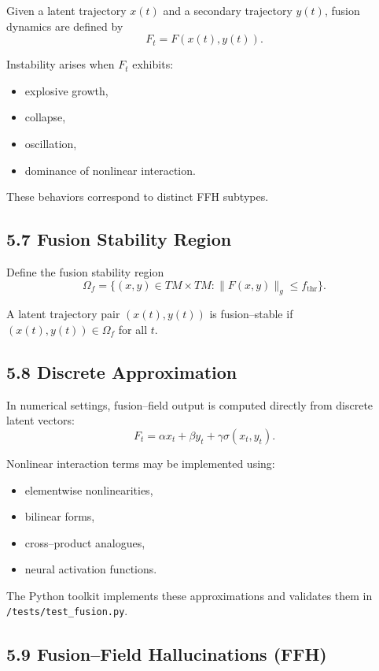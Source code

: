 Given a latent trajectory $x(t)$ and a secondary trajectory $y(t)$,
fusion dynamics are defined by
\[
F_t = F(x(t), y(t)).
\]

Instability arises when $F_t$ exhibits:
\begin{itemize}
\item explosive growth,
\item collapse,
\item oscillation,
\item dominance of nonlinear interaction.
\end{itemize}

These behaviors correspond to distinct FFH subtypes.

\subsection*{5.7 Fusion Stability Region}

Define the fusion stability region
\[
\Omega_f
= \{ (x,y) \in TM \times TM :
\|F(x,y)\|_g \le f_{\mathrm{thr}} \}.
\]

A latent trajectory pair $(x(t), y(t))$ is fusion–stable if
$(x(t), y(t)) \in \Omega_f$ for all $t$.

\subsection*{5.8 Discrete Approximation}

In numerical settings, fusion–field output is computed directly from
discrete latent vectors:
\[
F_t = \alpha x_t + \beta y_t + \gamma \sigma(x_t, y_t).
\]

Nonlinear interaction terms may be implemented using:
\begin{itemize}
\item elementwise nonlinearities,
\item bilinear forms,
\item cross–product analogues,
\item neural activation functions.
\end{itemize}

The Python toolkit implements these approximations and validates them in
\texttt{/tests/test\_fusion.py}.

\subsection*{5.9 Fusion–Field Hallucinations (FFH)}

